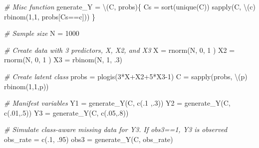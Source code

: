 \documentclass[
]{article}
\newenvironment{Shaded}{}{}
\newcommand{\CommentTok}[1]{\textcolor[rgb]{0.38,0.63,0.69}{\textit{#1}}}
\newcommand{\DecValTok}[1]{\textcolor[rgb]{0.25,0.63,0.44}{#1}}
\newcommand{\FunctionTok}[1]{\textcolor[rgb]{0.02,0.16,0.49}{#1}}
\newcommand{\NormalTok}[1]{#1}
\newcommand{\OtherTok}[1]{\textcolor[rgb]{0.00,0.44,0.13}{#1}}
\newcommand{\SpecialCharTok}[1]{\textcolor[rgb]{0.25,0.44,0.63}{#1}}
\begin{document}
\begin{Shaded}
\begin{Highlighting}[]
\CommentTok{\# Misc function}
\NormalTok{generate\_Y }\OtherTok{=}\NormalTok{ \textbackslash{}(C, probs)\{}
\NormalTok{  Cs }\OtherTok{=} \FunctionTok{sort}\NormalTok{(}\FunctionTok{unique}\NormalTok{(C))}
  \FunctionTok{sapply}\NormalTok{(C, \textbackslash{}(c) }\FunctionTok{rbinom}\NormalTok{(}\DecValTok{1}\NormalTok{,}\DecValTok{1}\NormalTok{, probs[Cs}\SpecialCharTok{==}\NormalTok{c]))}
\NormalTok{\}}

\CommentTok{\# Sample size}
\NormalTok{N        }\OtherTok{=} \DecValTok{1000} 

\CommentTok{\# Create data with 3 predictors, X, X2, and X3}
\NormalTok{X        }\OtherTok{=}  \FunctionTok{rnorm}\NormalTok{(N, }\DecValTok{0}\NormalTok{, }\DecValTok{1}\NormalTok{ )}
\NormalTok{X2       }\OtherTok{=}  \FunctionTok{rnorm}\NormalTok{(N, }\DecValTok{0}\NormalTok{, }\DecValTok{1}\NormalTok{ )}
\NormalTok{X3       }\OtherTok{=} \FunctionTok{rbinom}\NormalTok{(N, }\DecValTok{1}\NormalTok{, .}\DecValTok{3}\NormalTok{)}

\CommentTok{\# Create latent class}
\NormalTok{probs    }\OtherTok{=} \FunctionTok{plogis}\NormalTok{(}\DecValTok{3}\SpecialCharTok{*}\NormalTok{X}\SpecialCharTok{+}\NormalTok{X2}\SpecialCharTok{+}\DecValTok{5}\SpecialCharTok{*}\NormalTok{X3}\DecValTok{{-}1}\NormalTok{)}
\NormalTok{C        }\OtherTok{=} \FunctionTok{sapply}\NormalTok{(probs, \textbackslash{}(p) }\FunctionTok{rbinom}\NormalTok{(}\DecValTok{1}\NormalTok{,}\DecValTok{1}\NormalTok{,p))}

\CommentTok{\# Manifest variables}
\NormalTok{Y1       }\OtherTok{=} \FunctionTok{generate\_Y}\NormalTok{(C, }\FunctionTok{c}\NormalTok{(.}\DecValTok{1}\NormalTok{ ,.}\DecValTok{3}\NormalTok{))}
\NormalTok{Y2       }\OtherTok{=} \FunctionTok{generate\_Y}\NormalTok{(C, }\FunctionTok{c}\NormalTok{(.}\DecValTok{01}\NormalTok{,.}\DecValTok{5}\NormalTok{))}
\NormalTok{Y3       }\OtherTok{=} \FunctionTok{generate\_Y}\NormalTok{(C, }\FunctionTok{c}\NormalTok{(.}\DecValTok{05}\NormalTok{,.}\DecValTok{8}\NormalTok{))}

\CommentTok{\# Simulate class{-}aware missing data for Y3. If obs3==1, Y3 is observed}
\NormalTok{obs\_rate }\OtherTok{=} \FunctionTok{c}\NormalTok{(.}\DecValTok{1}\NormalTok{, .}\DecValTok{95}\NormalTok{)}
\NormalTok{obs3     }\OtherTok{=} \FunctionTok{generate\_Y}\NormalTok{(C, obs\_rate)}
\end{Highlighting}
\end{Shaded}
\end{document}
